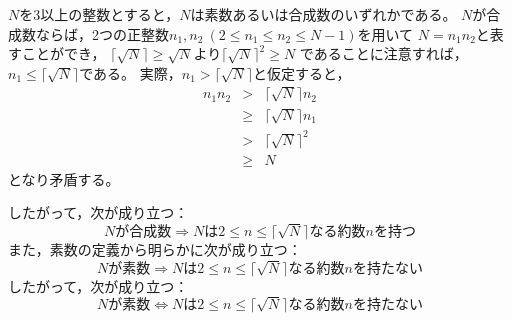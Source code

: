 \documentclass{article}
\begin{document}
$N$を3以上の整数とすると，$N$は素数あるいは合成数のいずれかである。
$N$が合成数ならば，2つの正整数$n_1, n_2\ (2 \leq n_1 \leq n_2 \leq N - 1)$を用いて
$N = n_1 n_2$と表すことができ，
$\lceil \sqrt{N} \rceil \geq \sqrt{N}$より$\lceil \sqrt{N} \rceil^2 \geq N$
であることに注意すれば，$n_1 \leq \lceil \sqrt{N} \rceil$である。
実際，$n_1 > \lceil \sqrt{N} \rceil$と仮定すると，
\begin{eqnarray*}
    n_1 n_2 &>&    \lceil \sqrt{N} \rceil n_2 \\
            &\geq& \lceil \sqrt{N} \rceil n_1 \\
            &>&    \lceil \sqrt{N} \rceil^2 \\
            &\geq& N
\end{eqnarray*}
となり矛盾する。

したがって，次が成り立つ：
\[
    \mbox{$N$が合成数} \Longrightarrow \mbox{$N$は$2 \leq n \leq \lceil \sqrt{N} \rceil$なる約数$n$を持つ}
\]
また，素数の定義から明らかに次が成り立つ：
\[
    \mbox{$N$が素数} \Longrightarrow \mbox{$N$は$2 \leq n \leq \lceil \sqrt{N} \rceil$なる約数$n$を持たない}
\]
したがって，次が成り立つ：
\[
    \mbox{$N$が素数} \Longleftrightarrow \mbox{$N$は$2 \leq n \leq \lceil \sqrt{N} \rceil$なる約数$n$を持たない}
\]
\end{document}
